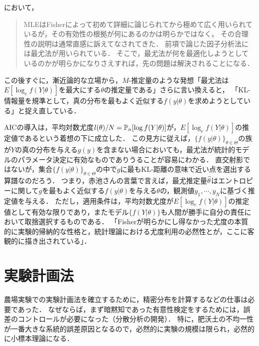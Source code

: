 \documentclass[uplatex,dvipdfmx]{jsreport}
\begin{document}
\begin{history}[赤池さんはFisherの超克を意識していた]
    \cite{Akaike76}において，
    \begin{quote}
        MLEはFisherによって初めて詳細に論じられてから極めて広く用いられているが，その有効性の根拠が何にあるのかは明らかではなく，
        その合理性の説明は通常直感に訴えてなされてきた．
        前項で論じた因子分析法には最尤法が用いられている．
        そこで，最尤法が何を最適化しようとしているのかが明らかになりさえすれば，先の問題は解決されることになる．
    \end{quote}
    この後すぐに，漸近論的な立場から，$M$-推定量のような発想「最尤法は$E[\log_ef(Y|\theta)]$を最大にする$\theta$の推定量である」さらに言い換えると，
    「KL-情報量を規準として，真の分布を最もよく近似する$f(y|\theta)$を求めようとしている」と捉え直している．

    AICの導入は，平均対数尤度$l(\theta)/N=\mathbb{P}_n[\log f(Y|\theta)]$が，$E[\log_ef(Y|\theta)]$の推定値であるという着想の下に成立した．
    この見方に従えば，$\{f(y|\theta)\}_{\theta\in\Theta}$の族が$Y$の真の分布を与える$g(y)$を含まない場合においても，最尤法が統計的モデルのパラメータ決定に有効なものでありうることが容易にわかる．
    直交射影ではないが，集合$\{f(y|\theta)\}_{\theta\in\Theta}$の中で$g$に最もKL-距離の意味で近い点を選出する算譜なのだろう．
    つまり，赤池さんの言葉で言えば，最尤推定量$\widehat{\theta}$はエントロピーに関して$g$を最もよく近似する$f(y|\theta)$を与える$\theta$の，観測値$y_1,\cdots,y_N$に基づく推定値を与える．
    ただし，適用条件は，平均対数尤度が$E[\log_ef(Y|\theta)]$の推定値として有効な限りであり，またモデル$\{f(Y|\theta)\}$も人間が勝手に自分の責任において取捨選択するものである．
    「Fisherが明らかにし得なかった尤度の本質的に実験的帰納的な性格と，統計理論における尤度利用の必然性とが，ここに客観的に描き出されている」．
\end{history}

\section{実験計画法}

\begin{tcolorbox}[colframe=ForestGreen, colback=ForestGreen!10!white,breakable,colbacktitle=ForestGreen!40!white,coltitle=black,fonttitle=\bfseries\sffamily,
title=]
    農場実験での実験計画法を確立するために，精密分布を計算するなどの仕事は必要であった．
    なぜならば，まず暗黙知であった有意性検定をするためには，誤差のコントロールが必要になった（分散分析の開発）．
    特に，肥沃土の不均一性が一番大きな系統的誤差原因となるので，必然的に実験の規模は限られ，必然的に小標本理論になる．
\end{tcolorbox}
\end{document}
